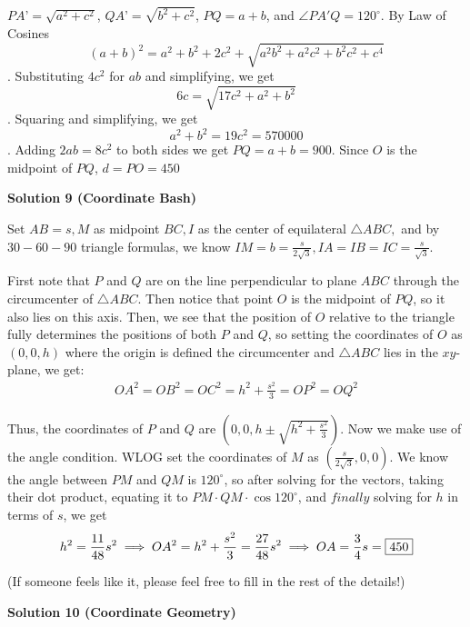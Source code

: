 \begin{enumerate}
 $PA’ = \sqrt{a^2 + c^2}$, $QA’ = \sqrt{b^2 + c^2}$, $PQ = a + b$, and $\angle PA'Q = 120^{\circ}$. By Law of Cosines 
 \[(a + b)^2 = a^2 + b^2 + 2c^2 + \sqrt{a^2b^2 + a^2c^2 + b^2c^2 + c^4}\]. Substituting $4c^2$ for $ab$ and simplifying, we get 
 \[6c = \sqrt{17c^2 + a^2 + b^2}\]. Squaring and simplifying, we get 
 \[a^2 + b^2 = 19c^2 = 570000\]. Adding $2ab = 8c^2$ to both sides we get $PQ = a + b = 900$. Since $O$ is the midpoint of $PQ$, $d = PO = \boxed{450}$




\textbf{Solution 9 (Coordinate Bash)}

Set $AB = s, M$ as midpoint $BC, I$ as the center of equilateral $\triangle ABC,$ and by $30-60-90$ triangle formulas, we know $IM = b = \frac {s}{2\sqrt{3}}, IA = IB = IC = \frac{s}{\sqrt{3}}$.

 First note that $P$ and $Q$ are on the line perpendicular to plane $ABC$ through the circumcenter of $\triangle ABC$. Then notice that point $O$ is the midpoint of $PQ$, so it also lies on this axis. Then, we see that the position of $O$ relative to the triangle fully determines the positions of both $P$ and $Q$, so setting the coordinates of $O$ as $(0,0,h)$ where the origin is defined the circumcenter and $\triangle ABC$ lies in the $xy$-plane, we get: 
 \begin{align*} OA^2 = OB^2 = OC^2 = h^2+\frac{s^2}{3} = OP^2 = OQ^2 \end{align*}


 Thus, the coordinates of $P$ and $Q$ are $(0,0,h\pm\sqrt{h^2+\frac{s^2}{3}})$. Now we make use of the angle condition. WLOG set the coordinates of $M$ as $(\frac{s}{2\sqrt{3}},0,0)$. We know the angle between $PM$ and $QM$ is $120^{\circ}$, so after solving for the vectors, taking their dot product, equating it to $PM \cdot QM \cdot\cos{120^{\circ}}$, and $\textit{finally}$ solving for $h$ in terms of $s$, we get 
 \[ h^2 = \frac{11}{48}s^2 \\ \implies OA^2 = h^2 + \frac{s^2}{3} = \frac{27}{48}s^2 \\ \implies OA = \frac{3}{4}s = \boxed{450} \]

 
(If someone feels like it, please feel free to fill in the rest of the details!)

 



\textbf{Solution 10 (Coordinate Geometry)}


\end{enumerate}
